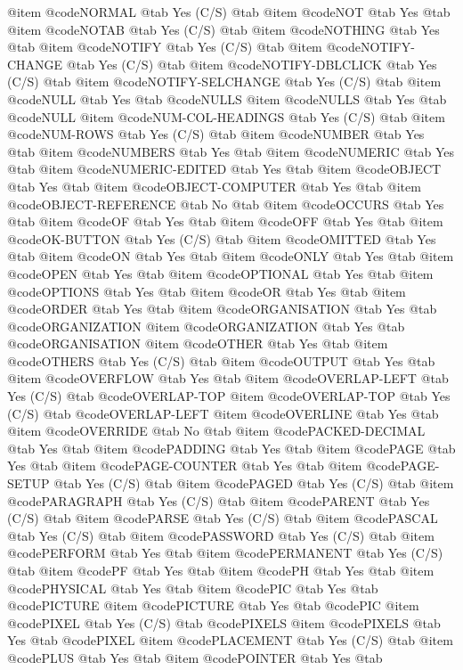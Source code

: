 @item @code{NORMAL} @tab Yes	(C/S) @tab 
@item @code{NOT} @tab Yes @tab 
@item @code{NOTAB} @tab Yes	(C/S) @tab 
@item @code{NOTHING} @tab Yes @tab 
@item @code{NOTIFY} @tab Yes	(C/S) @tab 
@item @code{NOTIFY-CHANGE} @tab Yes	(C/S) @tab 
@item @code{NOTIFY-DBLCLICK} @tab Yes	(C/S) @tab 
@item @code{NOTIFY-SELCHANGE} @tab Yes	(C/S) @tab 
@item @code{NULL} @tab Yes @tab @code{NULLS}
@item @code{NULLS} @tab Yes @tab @code{NULL}
@item @code{NUM-COL-HEADINGS} @tab Yes	(C/S) @tab 
@item @code{NUM-ROWS} @tab Yes	(C/S) @tab 
@item @code{NUMBER} @tab Yes @tab 
@item @code{NUMBERS} @tab Yes @tab 
@item @code{NUMERIC} @tab Yes @tab 
@item @code{NUMERIC-EDITED} @tab Yes @tab 
@item @code{OBJECT} @tab Yes @tab 
@item @code{OBJECT-COMPUTER} @tab Yes @tab 
@item @code{OBJECT-REFERENCE} @tab No @tab 
@item @code{OCCURS} @tab Yes @tab 
@item @code{OF} @tab Yes @tab 
@item @code{OFF} @tab Yes @tab 
@item @code{OK-BUTTON} @tab Yes	(C/S) @tab 
@item @code{OMITTED} @tab Yes @tab 
@item @code{ON} @tab Yes @tab 
@item @code{ONLY} @tab Yes @tab 
@item @code{OPEN} @tab Yes @tab 
@item @code{OPTIONAL} @tab Yes @tab 
@item @code{OPTIONS} @tab Yes @tab 
@item @code{OR} @tab Yes @tab 
@item @code{ORDER} @tab Yes @tab 
@item @code{ORGANISATION} @tab Yes @tab @code{ORGANIZATION}
@item @code{ORGANIZATION} @tab Yes @tab @code{ORGANISATION}
@item @code{OTHER} @tab Yes @tab 
@item @code{OTHERS} @tab Yes	(C/S) @tab 
@item @code{OUTPUT} @tab Yes @tab 
@item @code{OVERFLOW} @tab Yes @tab 
@item @code{OVERLAP-LEFT} @tab Yes	(C/S) @tab @code{OVERLAP-TOP}
@item @code{OVERLAP-TOP} @tab Yes	(C/S) @tab @code{OVERLAP-LEFT}
@item @code{OVERLINE} @tab Yes @tab 
@item @code{OVERRIDE} @tab No @tab 
@item @code{PACKED-DECIMAL} @tab Yes @tab 
@item @code{PADDING} @tab Yes @tab 
@item @code{PAGE} @tab Yes @tab 
@item @code{PAGE-COUNTER} @tab Yes @tab 
@item @code{PAGE-SETUP} @tab Yes	(C/S) @tab 
@item @code{PAGED} @tab Yes	(C/S) @tab 
@item @code{PARAGRAPH} @tab Yes	(C/S) @tab 
@item @code{PARENT} @tab Yes	(C/S) @tab 
@item @code{PARSE} @tab Yes	(C/S) @tab 
@item @code{PASCAL} @tab Yes	(C/S) @tab 
@item @code{PASSWORD} @tab Yes	(C/S) @tab 
@item @code{PERFORM} @tab Yes @tab 
@item @code{PERMANENT} @tab Yes	(C/S) @tab 
@item @code{PF} @tab Yes @tab 
@item @code{PH} @tab Yes @tab 
@item @code{PHYSICAL} @tab Yes @tab 
@item @code{PIC} @tab Yes @tab @code{PICTURE}
@item @code{PICTURE} @tab Yes @tab @code{PIC}
@item @code{PIXEL} @tab Yes	(C/S) @tab @code{PIXELS}
@item @code{PIXELS} @tab Yes @tab @code{PIXEL}
@item @code{PLACEMENT} @tab Yes	(C/S) @tab 
@item @code{PLUS} @tab Yes @tab 
@item @code{POINTER} @tab Yes @tab 
